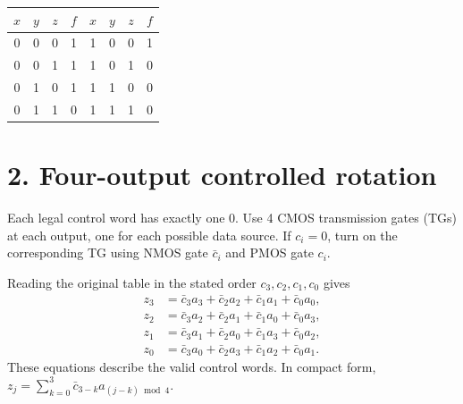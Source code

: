 \documentclass[11pt,a4paper]{article}
\begin{document}
\begin{center}
\begin{tabular}{cccc@{\qquad}cccc}
\toprule
$x$&$y$&$z$&$f$&$x$&$y$&$z$&$f$\\\midrule
0&0&0&1&1&0&0&1\\
0&0&1&1&1&0&1&0\\
0&1&0&1&1&1&0&0\\
0&1&1&0&1&1&1&0\\\bottomrule
\end{tabular}
\end{center}

\newpage
\section*{2. Four-output controlled rotation}
Each legal control word has exactly one 0. Use 4 CMOS transmission gates
(TGs) at each output, one for each possible data source. If $c_i=0$, turn on
the corresponding TG using NMOS gate $\bar c_i$ and PMOS gate $c_i$.

Reading the original table in the stated order $c_3,c_2,c_1,c_0$ gives
\begin{align*}
 z_3&=\bar c_3a_3+\bar c_2a_2+\bar c_1a_1+\bar c_0a_0,\\
 z_2&=\bar c_3a_2+\bar c_2a_1+\bar c_1a_0+\bar c_0a_3,\\
 z_1&=\bar c_3a_1+\bar c_2a_0+\bar c_1a_3+\bar c_0a_2,\\
 z_0&=\bar c_3a_0+\bar c_2a_3+\bar c_1a_2+\bar c_0a_1.
\end{align*}
These equations describe the valid control words. In compact form,
$z_j=\sum_{k=0}^{3}\bar c_{3-k}a_{(j-k)\bmod4}$.
\end{document}

